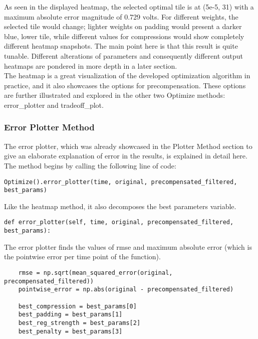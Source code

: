 \documentclass[11pt, a4paper]{article}
\theoremstyle{definition}
\numberwithin{equation}{section}
\begin{document}
As seen in the displayed heatmap, the selected optimal tile is at (5e-5, 31) with a maximum absolute error magnitude of 0.729 volts. For different weights, the selected tile would change; lighter weights on padding would present a darker blue, lower tile, while different values for compressions would show completely different heatmap snapshots. The main point here is that this result is quite tunable. Different alterations of parameters and consequently different output heatmaps are pondered in more depth in a later section.
\\
The heatmap is a great visualization of the developed optimization algorithm in practice, and it also showcases the options for precompensation. These options are further illustrated and explored in the other two Optimize methods: error_plotter and tradeoff\_plot.

\subsubsection{Error Plotter Method}

The error plotter, which was already showcased in the Plotter Method section to give an elaborate explanation of error in the results, is explained in detail here.
\\
The method begins by calling the following line of code:

\begin{verbatim}
Optimize().error_plotter(time, original, precompensated_filtered, best_params)
\end{verbatim}

Like the heatmap method, it also decomposes the best parameters variable.

\begin{verbatim}
def error_plotter(self, time, original, precompensated_filtered, best_params):
\end{verbatim}

The error plotter finds the values of rmse and maximum absolute error (which is the pointwise error per time point of the function).

\begin{verbatim}
    rmse = np.sqrt(mean_squared_error(original, precompensated_filtered))
    pointwise_error = np.abs(original - precompensated_filtered)
            
    best_compression = best_params[0]
    best_padding = best_params[1]
    best_reg_strength = best_params[2]
    best_penalty = best_params[3]
\end{verbatim}
\end{document}
